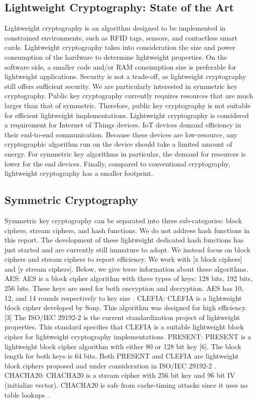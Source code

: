 \documentclass[conference]{IEEEtran}
\begin{document}
\subsection{Lightweight Cryptography: State of the Art}
Lightweight cryptography is an algorithm designed to be implemented in constrained environments, such as RFID tags, sensors, and contactless smart cards. Lightweight cryptography takes into consideration the size and power consumption of the hardware to determine lightweight properties. On the software side, a smaller code and/or RAM consumption size is preferable for lightweight applications. Security is not a trade-off, as lightweight cryptography still offers sufficient security. We are particularly interested in symmetric key cryptography. Public key cryptography currently requires resources that are much larger than that of symmetric. Therefore, public key cryptography is not suitable for efficient lightweight implementations.\cite{1}
Lightweight cryptography is considered a requirement for Internet of Things devices. IoT devices demand efficiency in their end-to-end communication. Because these devices are low-resource, any cryptographic algorithm run on the device should take a limited amount of energy. For symmetric key algorithms in particular, the demand for resources is lower for the end devices. Finally, compared to conventional cryptography, lightweight cryptography has a smaller footprint.\cite{1} 

\subsection{Symmetric Cryptography}
Symmetric key cryptography can be separated into three sub-categories: block ciphers, stream ciphers, and hash functions. We do not address hash functions in this report. The development of these lightweight dedicated hash functions has just started and are currently still immature to adopt. \cite{2} We instead focus on block ciphers and stream ciphers to report efficiency. We work with [x block ciphers] and [y stream ciphers]. Below, we give terse information about these algorithms.
AES: AES is a block cipher algorithm with three types of keys: 128 bits, 192 bits, 256 bits. These keys are used for both encryption and decryption. AES has 10, 12, and 14 rounds respectively to key size \cite{4}.   
CLEFIA: CLEFIA is a lightweight block cipher developed by Sony. This algorithm was designed for high efficiency.[3] The ISO/IEC 29192-2 is the current standardization project of lightweight properties. This standard specifies that CLEFIA is a suitable lightweight block cipher for lightweight cryptography implementations.
PRESENT: PRESENT is a lightweight block cipher algorithm with either 80 or 128 bit key [6]. The block length for both keys is 64 bits. 
Both PRESENT and CLEFIA are lightweight block ciphers proposed and under consideration in ISO/IEC 29192-2 \cite{3}.
CHACHA20: CHACHA20 is a stream cipher with 256 bit key and 96 bit IV (initialize vector). CHACHA20 is safe from cache-timing attacks since it uses no table lookups \cite{6}.  
\end{document}
